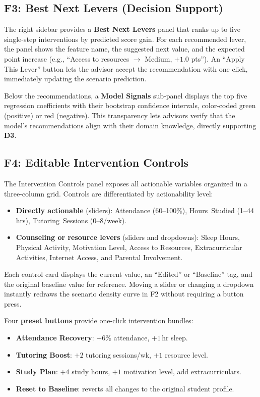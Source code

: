 \documentclass[11pt]{article}
\begin{document}
\subsection{F3: Best Next Levers (Decision Support)}

The right sidebar provides a \textbf{Best Next Levers} panel that ranks up to five single-step interventions by predicted score gain. For each recommended lever, the panel shows the feature name, the suggested next value, and the expected point increase (e.g., ``Access to resources $\rightarrow$ Medium, $+1.0$ pts''). An ``Apply This Lever'' button lets the advisor accept the recommendation with one click, immediately updating the scenario prediction.

Below the recommendations, a \textbf{Model Signals} sub-panel displays the top five regression coefficients with their bootstrap confidence intervals, color-coded green (positive) or red (negative). This transparency lets advisors verify that the model's recommendations align with their domain knowledge, directly supporting \textbf{D3}.

\subsection{F4: Editable Intervention Controls}

The Intervention Controls panel exposes all actionable variables organized in a three-column grid. Controls are differentiated by actionability level:

\begin{itemize}
  \item \textbf{Directly actionable} (sliders): Attendance (60--100\%), Hours~Studied (1--44\,hrs), Tutoring~Sessions (0--8/week).
  \item \textbf{Counseling or resource levers} (sliders and dropdowns): Sleep Hours, Physical Activity, Motivation Level, Access to Resources, Extracurricular Activities, Internet Access, and Parental Involvement.
\end{itemize}

Each control card displays the current value, an ``Edited'' or ``Baseline'' tag, and the original baseline value for reference. Moving a slider or changing a dropdown instantly redraws the scenario density curve in F2 without requiring a button press.

Four \textbf{preset buttons} provide one-click intervention bundles:
\begin{itemize}
  \item \textbf{Attendance Recovery}: $+6$\% attendance, $+1$\,hr sleep.
  \item \textbf{Tutoring Boost}: $+2$ tutoring sessions/wk, $+1$ resource level.
  \item \textbf{Study Plan}: $+4$ study hours, $+1$ motivation level, add extracurriculars.
  \item \textbf{Reset to Baseline}: reverts all changes to the original student profile.
\end{itemize}
\end{document}
